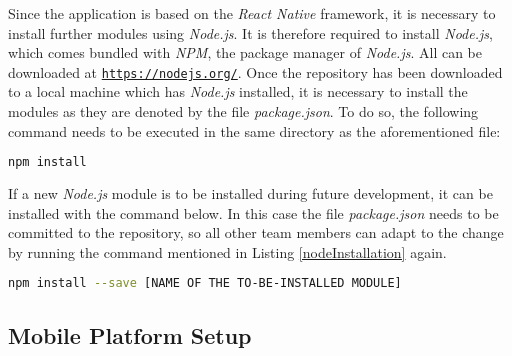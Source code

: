 Since the application is based on the \textit{React Native} framework, it is necessary to install further modules using \textit{Node.js}. It is therefore required to install \textit{Node.js}, which comes bundled with \textit{NPM}, the package manager of \textit{Node.js}. All can be downloaded at \href{https://nodejs.org/}{\nolinkurl{https://nodejs.org/}}.
\newline
Once the repository has been downloaded to a local machine which has \textit{Node.js} installed, it is necessary to install the modules as they are denoted by the file \textit{package.json}. To do so, the following command needs to be executed in the same directory as the aforementioned file:

\begin{lstlisting}[language=bash,caption=\textit{Node.js} Installation,label=nodeInstallation]
npm install
\end{lstlisting}

If a new \textit{Node.js} module is to be installed during future development, it can be installed with the command below. In this case the file \textit{package.json} needs to be committed to the repository, so all other team members can adapt to the change by running the command mentioned in Listing \ref{nodeInstallation} again.

\begin{lstlisting}[language=bash,caption=\textit{Node.js} Installation of a specific module,label=nodeInstallationSpecificModule]
npm install --save [NAME OF THE TO-BE-INSTALLED MODULE]
\end{lstlisting}

\subsection{Mobile Platform Setup}
\label{ssec:mobile}

